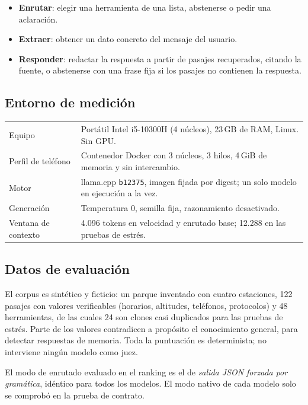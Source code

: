 \documentclass[11pt,a4paper]{article}
\newcommand{\m}[1]{\texttt{#1}}
\begin{document}
\begin{itemize}
\item \textbf{Enrutar}: elegir una herramienta de una lista, abstenerse o pedir una aclaración.
\item \textbf{Extraer}: obtener un dato concreto del mensaje del usuario.
\item \textbf{Responder}: redactar la respuesta a partir de pasajes recuperados, citando la fuente, o abstenerse con una frase fija si los pasajes no contienen la respuesta.
\end{itemize}

\subsection{Entorno de medición}

\begin{tabularx}{\textwidth}{@{}lL@{}}
\toprule
Equipo & Portátil Intel i5-10300H (4 núcleos), 23\,GB de RAM, Linux. Sin GPU.\\
Perfil de teléfono & Contenedor Docker con 3 núcleos, 3 hilos, 4\,GiB de memoria y sin intercambio.\\
Motor & llama.cpp \m{b12375}, imagen fijada por digest; un solo modelo en ejecución a la vez.\\
Generación & Temperatura 0, semilla fija, razonamiento desactivado.\\
Ventana de contexto & 4.096 tokens en velocidad y enrutado base; 12.288 en las pruebas de estrés.\\
\bottomrule
\end{tabularx}

\subsection{Datos de evaluación}

El corpus es sintético y ficticio: un parque inventado con cuatro estaciones, 122 pasajes con valores verificables (horarios, altitudes, teléfonos, protocolos) y 48 herramientas, de las cuales 24 son clones casi duplicados para las pruebas de estrés. Parte de los valores contradicen a propósito el conocimiento general, para detectar respuestas de memoria. Toda la puntuación es determinista; no interviene ningún modelo como juez.

El modo de enrutado evaluado en el ranking es el de \emph{salida JSON forzada por gramática}, idéntico para todos los modelos. El modo nativo de cada modelo solo se comprobó en la prueba de contrato.
\end{document}
